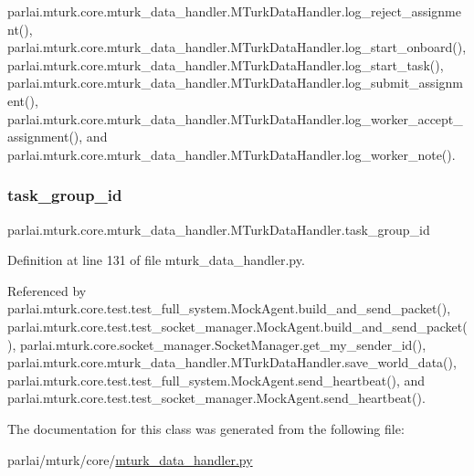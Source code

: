 parlai.\+mturk.\+core.\+mturk\+\_\+data\+\_\+handler.\+M\+Turk\+Data\+Handler.\+log\+\_\+reject\+\_\+assignment(), parlai.\+mturk.\+core.\+mturk\+\_\+data\+\_\+handler.\+M\+Turk\+Data\+Handler.\+log\+\_\+start\+\_\+onboard(), parlai.\+mturk.\+core.\+mturk\+\_\+data\+\_\+handler.\+M\+Turk\+Data\+Handler.\+log\+\_\+start\+\_\+task(), parlai.\+mturk.\+core.\+mturk\+\_\+data\+\_\+handler.\+M\+Turk\+Data\+Handler.\+log\+\_\+submit\+\_\+assignment(), parlai.\+mturk.\+core.\+mturk\+\_\+data\+\_\+handler.\+M\+Turk\+Data\+Handler.\+log\+\_\+worker\+\_\+accept\+\_\+assignment(), and parlai.\+mturk.\+core.\+mturk\+\_\+data\+\_\+handler.\+M\+Turk\+Data\+Handler.\+log\+\_\+worker\+\_\+note().

\mbox{\label{classparlai_1_1mturk_1_1core_1_1mturk__data__handler_1_1MTurkDataHandler_abef46871b0b4686b67f0b4dcea99e81c}} 
\subsubsection{\texorpdfstring{task\+\_\+group\+\_\+id}{task\_group\_id}}
{\footnotesize\ttfamily parlai.\+mturk.\+core.\+mturk\+\_\+data\+\_\+handler.\+M\+Turk\+Data\+Handler.\+task\+\_\+group\+\_\+id}



Definition at line 131 of file mturk\+\_\+data\+\_\+handler.\+py.



Referenced by parlai.\+mturk.\+core.\+test.\+test\+\_\+full\+\_\+system.\+Mock\+Agent.\+build\+\_\+and\+\_\+send\+\_\+packet(), parlai.\+mturk.\+core.\+test.\+test\+\_\+socket\+\_\+manager.\+Mock\+Agent.\+build\+\_\+and\+\_\+send\+\_\+packet(), parlai.\+mturk.\+core.\+socket\+\_\+manager.\+Socket\+Manager.\+get\+\_\+my\+\_\+sender\+\_\+id(), parlai.\+mturk.\+core.\+mturk\+\_\+data\+\_\+handler.\+M\+Turk\+Data\+Handler.\+save\+\_\+world\+\_\+data(), parlai.\+mturk.\+core.\+test.\+test\+\_\+full\+\_\+system.\+Mock\+Agent.\+send\+\_\+heartbeat(), and parlai.\+mturk.\+core.\+test.\+test\+\_\+socket\+\_\+manager.\+Mock\+Agent.\+send\+\_\+heartbeat().



The documentation for this class was generated from the following file\+:\begin{DoxyCompactItemize}
\item 
parlai/mturk/core/\hyperlink{mturk__data__handler_8py}{mturk\+\_\+data\+\_\+handler.\+py}\end{DoxyCompactItemize}

